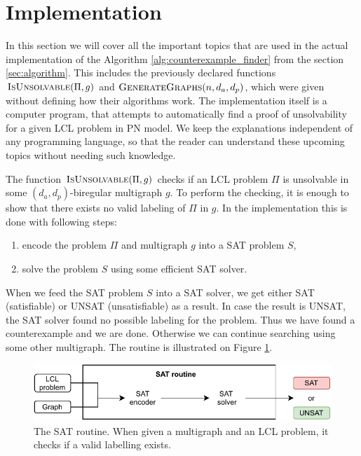 
\section{Implementation} \label{sec:implementation}
In this section we will cover all the important topics that are used in the actual implementation of the Algorithm \ref{alg:counterexample_finder} from the section \ref{sec:algorithm}.
This includes the previously declared functions $\textsc{IsUnsolvable}(\Pi, g)$ and $\textsc{GenerateGraphs}(n, d_a, d_p)$, which were given without defining how their algorithms work.
The implementation itself is a computer program, that attempts to automatically find a proof of unsolvability for a given LCL problem in PN model.
We keep the explanations independent of any programming language, so that the reader can understand these upcoming topics without needing such knowledge.

The function $\textsc{IsUnsolvable}(\Pi, g)$ checks if an LCL problem $\Pi$ is unsolvable in some $(d_a, d_p)$-biregular multigraph $g$.
To perform the checking, it is enough to show that there exists no valid labeling of $\Pi$ in $g$.
In the implementation this is done with following steps:
\begin{enumerate}
    \item encode the problem $\Pi$ and multigraph $g$ into a SAT problem $S$,
    \item solve the problem $S$ using some efficient SAT solver.
\end{enumerate}
When we feed the SAT problem $S$ into a SAT solver, we get either SAT (satisfiable) or UNSAT (unsatisfiable) as a result.
In case the result is UNSAT, the SAT solver found no possible labeling for the problem.
Thus we have found a counterexample and we are done.
Otherwise we can continue searching using some other multigraph.
The routine is illustrated on Figure \ref{fig:implementation:1}.

\begin{figure}[H]
\centering
\includegraphics[]{diagrams/implementation_idea_diagram2.pdf}
\caption{The SAT routine. When given a multigraph and an LCL problem, it checks if a valid labelling exists.}
\label{fig:implementation:1}
\end{figure}

